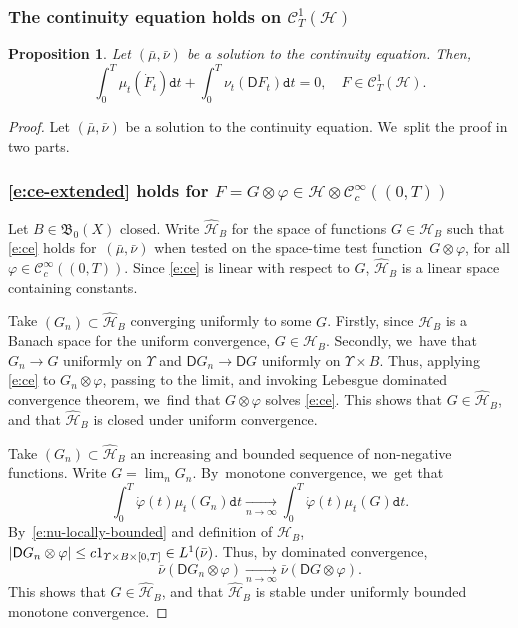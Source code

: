 \documentclass[10pt]{amsart}
\newtheorem{proposition}[theorem]{Proposition}
\theoremstyle{definition}
\theoremstyle{remark}
\DeclarePairedDelimiter{\abs}{\lvert}{\rvert}
\let\Subsubsection\subsubsection
\begin{document}
\Subsubsection{The continuity equation holds on \texorpdfstring{$\mathscr{C}^{1}_{T}(\mathscr{H})$}{H-valued continuously differentiable functions}}
\begin{proposition}\label{t:ce-extended}
Let $(\bar{\mu}, \bar{\nu})$ be a solution to the continuity equation.
Then,
\begin{equation}\label{e:ce-extended}
\int_{0}^{T} \mu_{t}(\dot{F}_{t}) \mathtt{d} t + \int_{0}^{T} \nu_{t}(\mathsf{D} F_{t}) \mathtt{d} t = 0, \quad F \in \mathscr{C}^{1}_{T}(\mathscr{H}).
\end{equation}
\end{proposition}
\begin{proof}
Let $(\bar{\mu}, \bar{\nu})$ be a solution to the continuity equation. We~split the proof in two parts.
\subsubsection*{\cref{e:ce-extended} holds for $F = G \otimes \varphi \in \mathscr{H} \otimes \mathscr{C}_{c}^{\infty}((0,T))$}
Let $B \in \mathfrak{B}_{0}(X)$ closed.
Write $\hat{\mathscr{H}}_{B}$ for the space of functions $G \in \mathscr{H}_{B}$ such that \cref{e:ce} holds for~$(\bar\mu,\bar\nu)$ when tested on the space-time test function~$G \otimes \varphi$, for all $\varphi \in \mathscr{C}_{c}^{\infty}((0,T))$.
Since \cref{e:ce} is linear with respect to $G$, $\hat{\mathscr{H}}_{B}$ is a linear space containing constants.

Take $(G_{n}) \subset \hat{\mathscr{H}}_{B}$ converging uniformly to some $G$.
Firstly, since $\mathscr{H}_{B}$ is a Banach space for the uniform convergence, $G \in \mathscr{H}_{B}$.
Secondly, we~have that $G_{n} \to G$ uniformly on $\varUpsilon$ and $\mathsf{D} G_{n} \to \mathsf{D} G$ uniformly on $\varUpsilon \times B$.
Thus, applying \cref{e:ce} to $G_{n} \otimes \varphi$, passing to the limit, and invoking Lebesgue dominated convergence theorem, we~find that $G \otimes \varphi$ solves \cref{e:ce}.
This shows that $G \in \hat{\mathscr{H}}_{B}$, and that $\hat{\mathscr{H}}_{B}$ is closed under uniform convergence.

Take $(G_{n})\subset \hat{\mathscr{H}}_{B}$ an increasing and bounded sequence of non-negative functions.
Write $G = \lim_{n} G_{n}$.
By~monotone convergence, we~get that
\begin{equation*}
\int_{0}^{T} \dot{\varphi}(t) \mu_{t}(G_{n}) \mathtt{d} t \xrightarrow[n \to \infty]{} \int_{0}^{T} \dot{\varphi}(t) \mu_{t}(G) \mathtt{d} t.
\end{equation*}
By~\cref{e:nu-locally-bounded} and definition of $\mathscr{H}_{B}$, $\abs{\mathsf{D} G_{n} \otimes \varphi} \leq c 1_{\varUpsilon \times B \times [0,T]} \in L^{1}(\bar{\nu})$.
Thus, by dominated convergence,
\begin{equation*}
\bar{\nu}(\mathsf{D} G_{n} \otimes \varphi) \xrightarrow[n \to \infty]{} \bar{\nu}(\mathsf{D} G \otimes \varphi).
\end{equation*}
This shows that $G \in \hat{\mathscr{H}}_{B}$, and that $\hat{\mathscr{H}}_{B}$ is stable under uniformly bounded monotone convergence.


\end{proof}
\end{document}
